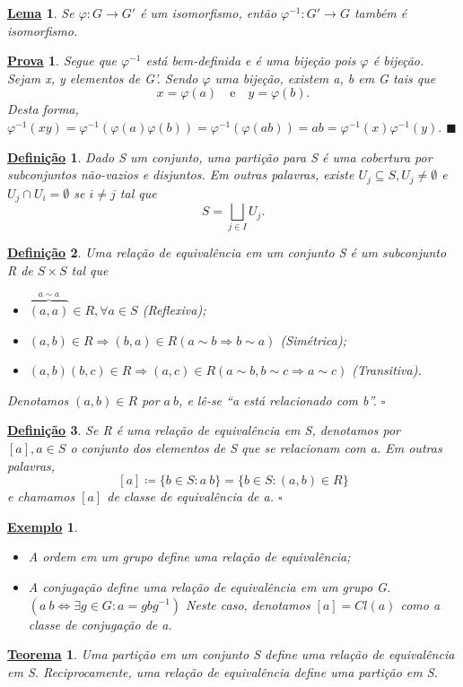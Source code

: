 \documentclass{article}
\newtheorem*{def*}{\underline{Defini\c c\~ao}}
\newtheorem*{theorem*}{\underline{Teorema}}
\newtheorem{example*}{\underline{Exemplo}}
\newtheorem*{proof*}{\underline{Prova}}
\newtheorem*{lemma*}{\underline{Lema}}
\renewcommand\qedsymbol{$\blacksquare$}
\begin{document}
\begin{lemma*}
  Se $\varphi:G\rightarrow G'$ \'e um isomorfismo, ent\~ao $\varphi^{-1}:G'\rightarrow G$ tamb\'em \'e isomorfismo. 
\end{lemma*}
\begin{proof*}
  Segue que $\varphi^{-1}$ est\'a bem-definida e \'e uma bije\c c\~ao pois $\varphi$ \'e bije\c c\~ao. Sejam x, y elementos de G'.
Sendo $\varphi$ uma bije\c c\~ao, existem a, b em G tais que 
  $$
  x = \varphi(a)\quad\text{e}\quad y = \varphi(b).
  $$
  Desta forma, $\varphi^{-1}(xy) = \varphi^{-1}(\varphi(a)\varphi(b)) = \varphi^{-1}(\varphi(ab)) = ab = \varphi^{-1}(x)\varphi^{-1}(y).$ \qedsymbol
\end{proof*}
 \begin{def*}
   Dado S um conjunto, uma parti\c c\~ao para S \'e uma cobertura por subconjuntos n\~ao-vazios e disjuntos. Em outras palavras,
existe $U_{j}\subseteq{S}, U_{j}\neq\emptyset$ e $U_{j}\cap U_{i} = \emptyset$ se $i\neq j$ tal que 
  $$
    S = \bigsqcup_{j\in I}U_{j}.
  $$
 \end{def*}
\begin{def*}
  Uma rela\c c\~ao de equival\^encia em um conjunto S \'e um subconjunto R de $S\times S$ tal que 
 \begin{itemize}
   \item[-]$\overbrace{(a, a)}^{a\sim a}\in R, \forall a\in S$ (Reflexiva);
   \item[-]$(a, b)\in R \Rightarrow (b, a)\in R (a\sim b \Rightarrow b\sim a)$ (Sim\'etrica);
   \item[-]$(a, b)(b, c)\in R \Rightarrow (a, c)\in R (a\sim b, b\sim c \Rightarrow a\sim c)$ (Transitiva).
 \end{itemize}
 Denotamos $(a, b)\in R$ por $a~b$, e l\^e-se ``a est\'a relacionado com b''. $\square$
\end{def*}
 \begin{def*}
   Se R \'e uma rela\c c\~ao de equival\^encia em S, denotamos por $[a], a\in S$ o conjunto dos elementos de S que se relacionam com a. Em outras palavras, 
     $$
     [a]\coloneqq\{b\in S: a~b\} = \{b\in S: (a, b)\in R\}
     $$
     e chamamos $[a]$ de classe de equival\^encia de a. $\square$
 \end{def*}
\begin{example*}
 \begin{itemize}
   \item[1)] A ordem em um grupo define uma rela\c c\~ao de equival\^encia;
   \item[2)] A conjuga\c c\~ao define uma rela\c c\~ao de equival\^encia em um grupo G. $(a~b \Longleftrightarrow \exists g\in G: a = gbg^{-1})$
     Neste caso, denotamos $[a] = Cl(a)$ como a classe de conjuga\c c\~ao de a.
 \end{itemize}
\end{example*}
\begin{theorem*}
  Uma parti\c c\~ao em um conjunto S define uma rela\c c\~ao de equival\^encia em S. Reciprocamente, uma rela\c c\~ao de 
equival\^encia define uma parti\c c\~ao em S.
\end{theorem*}
\newpage
\end{document}
